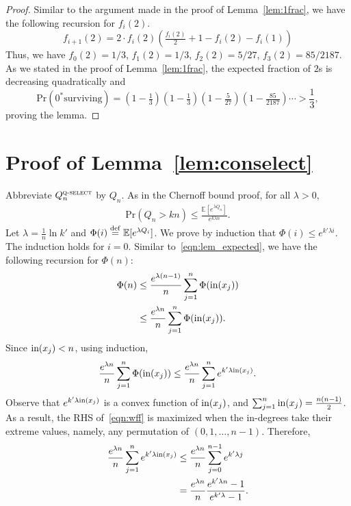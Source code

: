 \documentclass[twoside,11pt]{article}
\newcommand{\df}[1][\rm{def}]{\stackrel{#1}{=}}
\newcommand{\EE}{\mathbb{E}}
\newcommand{\pr}{\text{Pr}}
\newcommand{\algorithms}[1]{\textsc{#1}}
\newcommand{\algquickselect}{\algorithms{q-select}}
\newcommand{\din}{\textnormal{in}}
\begin{document}
\begin{example}
\begin{lemma}
\end{lemma}
\begin{proof}
Similar to the argument made in the proof of Lemma~\ref{lem:1frac}, we have the following recursion for $f_i(2)$.
\[
f_{i+1}(2)=2 \cdot f_i(2) \left(\tfrac{f_i(2)}{2}+1-f_i(2)-f_i(1)\right)
\]
Thus, we have $f_0(2)=1/3$, $f_1(2)=1/3$, $f_2(2)=5/27$,
$f_3(2)=85/2187$. As we stated in the proof of Lemma~\ref{lem:1frac},
the expected fraction of $2$s is decreasing quadratically and
\[
 \pr(0^*
 \text{surviving})=(1-\tfrac13)(1-\tfrac13)(1-\tfrac5{27})(1-\tfrac{85}{2187})\cdots
 >\frac13,
\]
proving the lemma. 
\end{proof}
\end{example}

\section{Proof of Lemma~\ref{lem:conselect}}
\label{sec:app-upp}
Abbreviate $Q_n^{\algquickselect}$ by $Q_n$. As in the Chernoff bound proof, for all $\lambda>0$,
 \begin{align}
  \label{eqn:chernoff}
  \pr(Q_n>kn) \le \frac{\EE[e^{\lambda Q_n}]}{e^{k\lambda n}}.
 \end{align}
 Let $\lambda=\frac1n \ln k'$ and $\Phi(i)\df\EE[e^{\lambda Q_i}]$. We
 prove by induction that $\Phi(i)\le e^{k'\lambda i}$. The induction
 holds for $i=0$. Similar to~\eqref{eqn:lem_expected}, we have the
 following recursion for $\Phi(n)$:
 \begin{align*}
  \Phi(n) &\le  \frac{e^{\lambda (n-1)}}{n} \sum_{j=1}^{n} \Phi(\din(x_j))\\
  &\le \frac{e^{\lambda n}}{n} \sum_{j=1}^{n} \Phi(\din(x_j)).
 \end{align*}
 Since $\din(x_j)<n$, using induction,
 \begin{align}
 \label{eqn:wff}
  \frac{e^{\lambda n}}{n} \sum_{j=1}^{n} \Phi(\din(x_j)) \le \frac{e^{\lambda n}}{n} \sum_{j=1}^{n} e^{k'\lambda \din(x_j)}.
 \end{align}
Observe that $e^{k'\lambda \din(x_j)}$ is a convex function of
$\din(x_j)$, and $\sum_{j=1}^n \din(x_j)=\frac{n(n-1)}{2}$. As a
result, the RHS of~\eqref{eqn:wff} is maximized when the in-degrees
take their extreme values, namely, any permutation of
$(0,1,\ldots,n-1)$. Therefore,
\begin{align*}
 \frac{e^{\lambda n}}{n} \sum_{j=1}^{n} e^{k'\lambda \din(x_j)} &\le \frac{e^{\lambda n}}{n} \sum_{j=0}^{n-1} e^{k'\lambda j}\\
 &=\frac{e^{\lambda n}}{n} \frac{e^{k'\lambda n}-1}{e^{k'\lambda}-1}.
 \end{align*}
\end{document}
